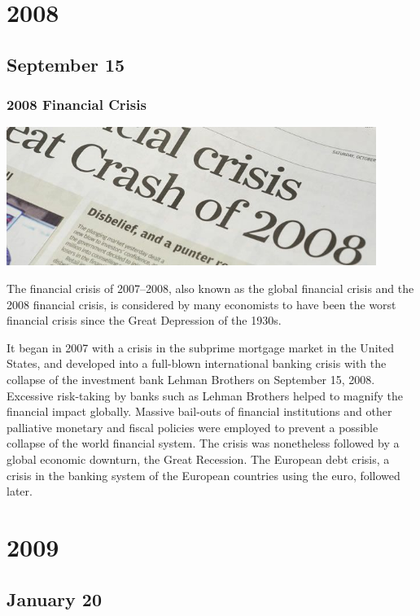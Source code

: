 \documentclass[11pt]{report}
\begin{document}
\chapter{2008}
\section{September 15}
\subsection{2008 Financial Crisis}
\vspace{2mm}\begin{center}\includegraphics[width=12cm]{./img/fcrash2008.jpg}\end{center}
The financial crisis of 2007–2008, also known as the global financial crisis and the 2008 financial crisis, is considered by many economists to have been the worst financial crisis since the Great Depression of the 1930s.

It began in 2007 with a crisis in the subprime mortgage market in the United States, and developed into a full-blown international banking crisis with the collapse of the investment bank Lehman Brothers on September 15, 2008. Excessive risk-taking by banks such as Lehman Brothers helped to magnify the financial impact globally. Massive bail-outs of financial institutions and other palliative monetary and fiscal policies were employed to prevent a possible collapse of the world financial system. The crisis was nonetheless followed by a global economic downturn, the Great Recession. The European debt crisis, a crisis in the banking system of the European countries using the euro, followed later.

\chapter{2009}
\section{January 20}
\end{document}

